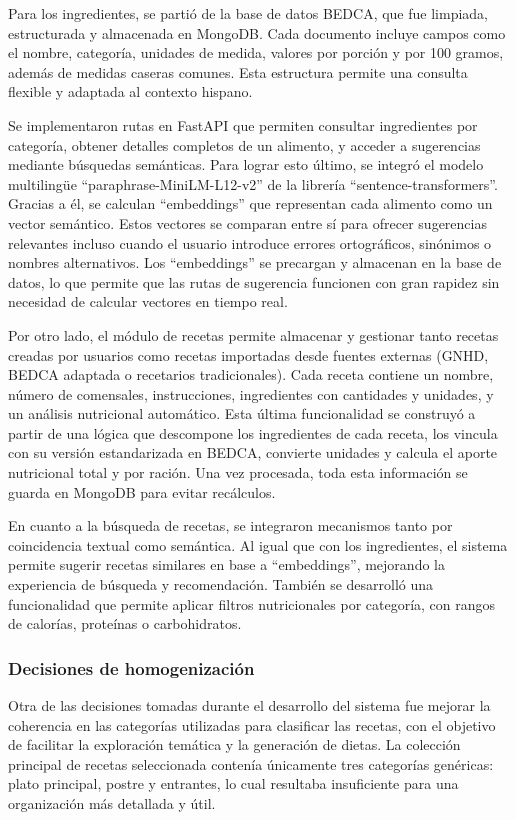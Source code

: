 Para los ingredientes, se partió de la base de datos BEDCA, que fue limpiada, estructurada y almacenada en MongoDB. Cada documento incluye campos como el nombre, categoría, unidades de medida, valores por porción y por 100 gramos, además de medidas caseras comunes. Esta estructura permite una consulta flexible y adaptada al contexto hispano.

Se implementaron rutas en FastAPI que permiten consultar ingredientes por categoría, obtener detalles completos de un alimento, y acceder a sugerencias mediante búsquedas semánticas. Para lograr esto último, se integró el modelo multilingüe ``paraphrase-MiniLM-L12-v2'' de la librería ``sentence-transformers''. Gracias a él, se calculan ``embeddings'' que representan cada alimento como un vector semántico. Estos vectores se comparan entre sí para ofrecer sugerencias relevantes incluso cuando el usuario introduce errores ortográficos, sinónimos o nombres alternativos. Los ``embeddings'' se precargan y almacenan en la base de datos, lo que permite que las rutas de sugerencia funcionen con gran rapidez sin necesidad de calcular vectores en tiempo real.

Por otro lado, el módulo de recetas permite almacenar y gestionar tanto recetas creadas por usuarios como recetas importadas desde fuentes externas (GNHD, BEDCA adaptada o recetarios tradicionales). Cada receta contiene un nombre, número de comensales, instrucciones, ingredientes con cantidades y unidades, y un análisis nutricional automático. Esta última funcionalidad se construyó a partir de una lógica que descompone los ingredientes de cada receta, los vincula con su versión estandarizada en BEDCA, convierte unidades y calcula el aporte nutricional total y por ración. Una vez procesada, toda esta información se guarda en MongoDB para evitar recálculos.

En cuanto a la búsqueda de recetas, se integraron mecanismos tanto por coincidencia textual como semántica. Al igual que con los ingredientes, el sistema permite sugerir recetas similares en base a ``embeddings'', mejorando la experiencia de búsqueda y recomendación. También se desarrolló una funcionalidad que permite aplicar filtros nutricionales por categoría, con rangos de calorías, proteínas o carbohidratos.

\subsubsection*{Decisiones de homogenización}
Otra de las decisiones tomadas durante el desarrollo del sistema fue mejorar la coherencia en las categorías utilizadas para clasificar las recetas, con el objetivo de facilitar la exploración temática y la generación de dietas. La colección principal de recetas seleccionada contenía únicamente tres categorías genéricas: plato principal, postre y entrantes, lo cual resultaba insuficiente para una organización más detallada y útil.


